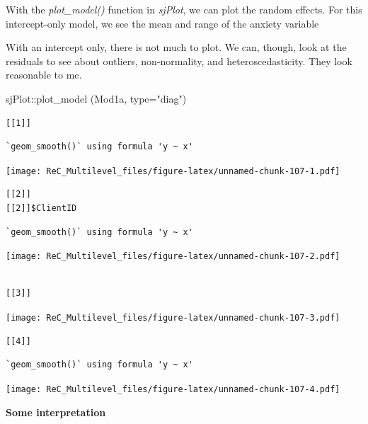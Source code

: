 \documentclass[
  11pt,
]{book}
\newenvironment{Shaded}{\begin{snugshade}}{\end{snugshade}}
\newcommand{\AttributeTok}[1]{\textcolor[rgb]{0.77,0.63,0.00}{#1}}
\newcommand{\FunctionTok}[1]{\textcolor[rgb]{0.00,0.00,0.00}{#1}}
\newcommand{\NormalTok}[1]{#1}
\newcommand{\SpecialCharTok}[1]{\textcolor[rgb]{0.00,0.00,0.00}{#1}}
\newcommand{\StringTok}[1]{\textcolor[rgb]{0.31,0.60,0.02}{#1}}
\begin{document}
With the \emph{plot\_model()} function in \emph{sjPlot}, we can plot the random effects. For this intercept-only model, we see the mean and range of the anxiety variable

With an intercept only, there is not much to plot. We can, though, look at the residuals to see about outliers, non-normality, and heteroscedasticity. They look reasonable to me.

\begin{Shaded}
\begin{Highlighting}[]
\NormalTok{sjPlot}\SpecialCharTok{::}\FunctionTok{plot\_model}\NormalTok{ (Mod1a, }\AttributeTok{type=}\StringTok{"diag"}\NormalTok{)}
\end{Highlighting}
\end{Shaded}

\begin{verbatim}
[[1]]
\end{verbatim}

\begin{verbatim}
`geom_smooth()` using formula 'y ~ x'
\end{verbatim}

\texttt{[image: ReC\_Multilevel\_files/figure-latex/unnamed-chunk-107-1.pdf]}

\begin{verbatim}
[[2]]
[[2]]$ClientID
\end{verbatim}

\begin{verbatim}
`geom_smooth()` using formula 'y ~ x'
\end{verbatim}

\texttt{[image: ReC\_Multilevel\_files/figure-latex/unnamed-chunk-107-2.pdf]}

\begin{verbatim}

[[3]]
\end{verbatim}

\texttt{[image: ReC\_Multilevel\_files/figure-latex/unnamed-chunk-107-3.pdf]}

\begin{verbatim}
[[4]]
\end{verbatim}

\begin{verbatim}
`geom_smooth()` using formula 'y ~ x'
\end{verbatim}

\texttt{[image: ReC\_Multilevel\_files/figure-latex/unnamed-chunk-107-4.pdf]}

\textbf{Some interpretation}
\end{document}
